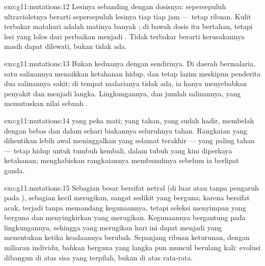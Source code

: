 \begin{solution}{exo:g11:mutations:12}
Lesinya sebanding dengan dosisnya: sepersepuluh ultravioletnya berarti
sepersepuluh lesinya tiap  tiap jam --- tetap ribuan. Kulit terbakar
matahari adalah matinya banyak ; di bawah dosis itu  bertahan,
tetapi lesi yang lolos dari perbaikan menjadi . Tidak terbakar
berarti kerusakannya masih dapat dilewati, bukan tidak ada.
\end{solution}

\begin{solution}{exo:g11:mutations:13}
Bukan keduanya dengan sendirinya. Di daerah bermalaria, satu salinannya
menaikkan ketahanan hidup, dan  tetap lazim meskipun penderita
dua salinannya sakit; di tempat malarianya tidak ada, ia hanya
menyebabkan penyakit dan menjadi langka. Lingkungannya, dan jumlah
salinannya, yang memutuskan nilai sebuah .
\end{solution}

\begin{solution}{exo:g11:mutations:14}
 yang peka mati;  yang tahan, yang sudah hadir, membelah dengan
bebas dan dalam sehari biakannya seluruhnya tahan. Rangkaian yang
dihentikan lebih awal meninggalkan yang selamat terakhir --- yang
paling tahan --- tetap hidup untuk tumbuh kembali, dalam tubuh yang
kini diperkaya ketahanan; menghabiskan rangkaiannya membunuhnya sebelum
ia berlipat ganda.
\end{solution}

\begin{solution}{exo:g11:mutations:15}
Sebagian besar  bersifat netral (di luar  atau tanpa pengaruh
pada ), sebagian kecil merugikan, sangat sedikit yang
berguna; karena bersifat acak,  terjadi tanpa memandang
kegunaannya, tetapi seleksi menyimpan yang berguna dan menyingkirkan
yang merugikan. Kegunaannya bergantung pada lingkungannya, sehingga
 yang merugikan hari ini dapat menjadi  yang menentukan
ketika keadaannya berubah. Sepanjang ribuan keturunan, dengan miliaran
individu, bahkan  berguna yang langka pun muncul berulang kali:
evolusi dibangun di atas sisa yang terpilah, bukan di atas 
rata-rata.
\end{solution}

